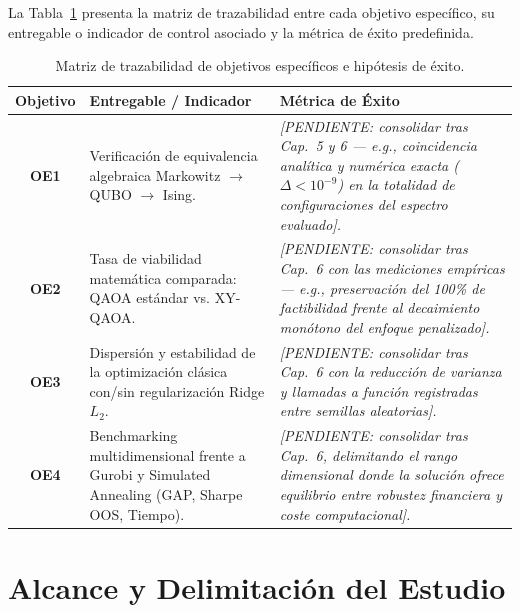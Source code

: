 La Tabla~\ref{tab:hipotesis_exito} presenta la matriz de trazabilidad entre cada objetivo específico, su entregable o indicador de control asociado y la métrica de éxito predefinida.

\begin{table}[htbp]
    \centering
    \small
    \caption{Matriz de trazabilidad de objetivos específicos e hipótesis de éxito.}
    \label{tab:hipotesis_exito}
    \renewcommand{\arraystretch}{1.25}
    \begin{tabular}{cp{5.2cm}p{6.8cm}}
        \toprule
        \textbf{Objetivo} & \textbf{Entregable / Indicador} & \textbf{Métrica de Éxito} \\
        \midrule
        \textbf{OE1} & Verificación de equivalencia algebraica Markowitz $\rightarrow$ QUBO $\rightarrow$ Ising. & \textit{[PENDIENTE: consolidar tras Cap.~5 y 6 --- e.g., coincidencia analítica y numérica exacta ($\Delta < 10^{-9}$) en la totalidad de configuraciones del espectro evaluado].} \\
        \addlinespace
        \textbf{OE2} & Tasa de viabilidad matemática comparada: QAOA estándar vs. XY-QAOA. & \textit{[PENDIENTE: consolidar tras Cap.~6 con las mediciones empíricas --- e.g., preservación del 100\% de factibilidad frente al decaimiento monótono del enfoque penalizado].} \\
        \addlinespace
        \textbf{OE3} & Dispersión y estabilidad de la optimización clásica con/sin regularización Ridge $L_2$. & \textit{[PENDIENTE: consolidar tras Cap.~6 con la reducción de varianza y llamadas a función registradas entre semillas aleatorias].} \\
        \addlinespace
        \textbf{OE4} & Benchmarking multidimensional frente a Gurobi y Simulated Annealing (GAP, Sharpe OOS, Tiempo). & \textit{[PENDIENTE: consolidar tras Cap.~6, delimitando el rango dimensional donde la solución ofrece equilibrio entre robustez financiera y coste computacional].} \\
        \bottomrule
    \end{tabular}
\end{table}

\section{Alcance y Delimitación del Estudio}
\label{sec:alcance_delimitacion}

